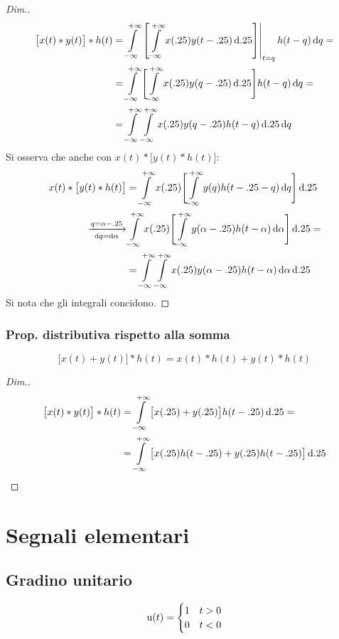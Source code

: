 \begin{proof}[Dim.]
\begin{align*}
	\bigl[x(t)\ast y(t)\bigr]\ast h(t)
	&= \intinf{\bound{t=q}{}{\intinf{x(\tau)y(t-\tau)}{\tau}}h(t-q)}{q} = \\
	&= \intinf{\Biggl[\intinf{x(\tau)y(q-\tau)}{\tau}\Biggr]h(t-q)}{q} = \\
	&= \intinf{\intinf{x(\tau)y(q-\tau)h(t-q)}{\tau}}{q}
\end{align*}
Si osserva che anche con $x(t)\ast \bigl[y(t) \ast h(t)\bigr]$:
\begin{align*}
	x(t)\ast\bigl[y(t) \ast h(t)\bigr]
	&= \intinf{x(\tau)\Biggl[\intinf{y(q)h(t-\tau-q)}{q}\Biggr]}{\tau} \\
	\xrightarrow[\diff{q}=\diff\alpha]{q=\alpha-\tau}
	& \intinf{x(\tau)\Biggl[\intinf{y(\alpha-\tau)h(t-\alpha)}{\alpha}\Biggr]}{\tau} = \\
	&= \intinf{\intinf{x(\tau)y(\alpha-\tau)h(t-\alpha)}{\alpha}}{\tau}
\end{align*}
Si nota che gli integrali concidono.
\end{proof}

\subsubsection{Prop. distributiva rispetto alla somma}
\begin{equation}
	\bigl[x(t)+y(t)\bigr]\ast h(t)= x(t)\ast h(t)+y(t)\ast h(t)
\end{equation}
\begin{proof}[Dim.]
\begin{align*}
	\bigl[x(t)\ast y(t)\bigr]\ast h(t)
	&= \intinf{\bigl[x(\tau) + y(\tau)\bigr]h(t-\tau)}{\tau} = \\
	&= \intinf{\bigl[x(\tau)h(t-\tau)+y(\tau)h(t-\tau)\bigr]}{\tau}
	\qedhere
\end{align*}
\end{proof}

\section{Segnali elementari}
\subsection{Gradino unitario}
\begin{equation}
	\step(t)=\begin{cases}
	1 & t>0 \\
	0 & t<0
	\end{cases}
\end{equation}
